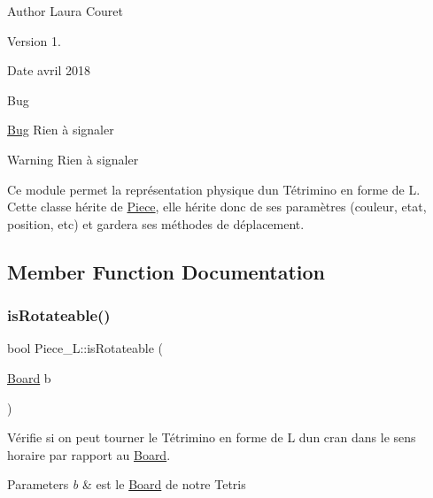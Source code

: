 \begin{DoxyAuthor}{Author}
Laura Couret 
\end{DoxyAuthor}
\begin{DoxyVersion}{Version}
1. 
\end{DoxyVersion}
\begin{DoxyDate}{Date}
avril 2018 
\end{DoxyDate}
\begin{DoxyRefDesc}{Bug}
\item[\hyperlink{bug__bug000013}{Bug}]Rien à signaler \end{DoxyRefDesc}
\begin{DoxyWarning}{Warning}
Rien à signaler
\end{DoxyWarning}
Ce module permet la représentation physique d\textquotesingle{}un Tétrimino en forme de L. Cette classe hérite de \hyperlink{classPiece}{Piece}, elle hérite donc de ses paramètres (couleur, etat, position, etc) et gardera ses méthodes de déplacement. 

\subsection{Member Function Documentation}
\mbox{\label{classPiece__L_a34954ce32a27bdadb4d56ca7f3d82cba}} 
\subsubsection{\texorpdfstring{is\+Rotateable()}{isRotateable()}}
{\footnotesize\ttfamily bool Piece\+\_\+\+L\+::is\+Rotateable (\begin{DoxyParamCaption}\item[{\hyperlink{classBoard}{Board}}]{b }\end{DoxyParamCaption})\hspace{0.3cm}{\ttfamily [virtual]}}



Vérifie si on peut tourner le Tétrimino en forme de L d\textquotesingle{}un cran dans le sens horaire par rapport au \hyperlink{classBoard}{Board}. 


\begin{DoxyParams}{Parameters}
{\em b} & est le \hyperlink{classBoard}{Board} de notre Tetris \\
\hline
\end{DoxyParams}


